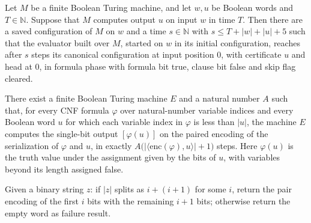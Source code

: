 \begin{lemma}
\label{Complexity.satEval_start}
\leanok
{}
Let $M$ be a finite Boolean Turing machine, and let $w,u$ be Boolean words and
$T\in\mathbb N$. Suppose that $M$ computes output $u$ on input $w$ in time $T$. Then
there are a saved configuration of $M$ on $w$ and a time $s\in\mathbb N$ with $s\le
T+|w|+|u|+5$ such that the evaluator built over $M$, started on $w$ in its initial
configuration, reaches after $s$ steps its canonical configuration at input position
$0$, with certificate $u$ and head at $0$, in formula phase with formula bit true,
clause bit false and skip flag cleared.
\end{lemma}

\begin{lemma}
\label{Complexity.satEval_computes}
\leanok
{}
There exist a finite Boolean Turing machine $E$ and a natural number $A$ such that, for
every CNF formula $\varphi$ over natural-number variable indices and every Boolean word
$u$ for which each variable index in $\varphi$ is less than $|u|$, the machine $E$
computes the single-bit output $[\varphi(u)]$ on the paired encoding of the
serialization of $\varphi$ and $u$, in exactly
$A\bigl(|\langle\mathrm{enc}(\varphi),u\rangle|+1\bigr)$ steps. Here $\varphi(u)$ is the
truth value under the assignment given by the bits of $u$, with variables beyond its
length assigned false.
\end{lemma}
\begin{definition}
\label{Complexity.satSplit}
\leanok
{}
Given a binary string $z$: if $|z|$ splits as $i + (i + 1)$ for some $i$, return
the pair encoding of the first $i$ bits with the remaining $i + 1$ bits; otherwise
return the empty word as failure result.
\end{definition}

